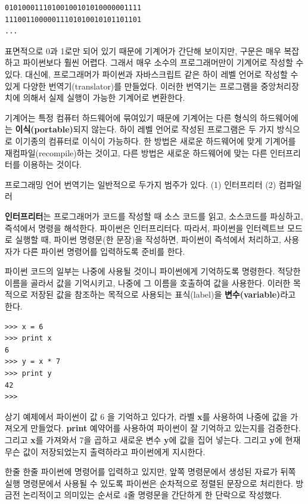 \beforeverb
\begin{verbatim}
01010001110100100101010000001111
11100110000011101010010101101101
...
\end{verbatim}
\afterverb
%
표면적으로 0과 1로만 되어 있기 때문에 기계어가 간단해 보이지만, 구문은 매우 복잡하고 파이썬보다 훨씬 어렵다. 
그래서 매우 소수의 프로그래머만이 기계어로 작성할 수 있다. 
대신에, 프로그래머가 파이썬과 자바스크립트 같은 하이 레벨 언어로 작성할 수 있게 다양한 번역기(translator)를 만들었다.  
이러한 번역기는 프로그램을 중앙처리장치에 의해서 실제 실행이 가능한 기계어로 변환한다.

기계어는 특정 컴퓨터 하드웨어에 묶여있기 때문에 기계어는 다른 형식의 하드웨어에는 {\bf 이식(portable)}되지 않는다. 
하이 레벨 언어로 작성된 프로그램은 두 가지 방식으로 이기종의 컴퓨터로 이식이 가능하다.
한 방법은 새로운 하드웨어에 맞게 기계어를 재컴파일(recompile)하는 것이고, 
다른 방법은 새로운 하드웨어에 맞는 다른 인터프리터를 이용하는 것이다.

프로그래밍 언어 번역기는 일반적으로 두가지 범주가 있다. 
(1) 인터프리터 (2) 컴파일러

{\bf 인터프리터}는 프로그래머가 코드를 작성할 때 소스 코드를 읽고, 소스코드를 파싱하고, 즉석에서 명령을 해석한다. 
파이썬은 인터프리터다. 
따라서, 파이썬을 인터렉트브 모드로 실행할 때, 파이썬 명령문(한 문장)을 작성하면, 파이썬이 즉석에서 처리하고, 
사용자가 다른 파이썬 명령어를 입력하도록 준비를 한다.

파이썬 코드의 일부는 나중에 사용될 것이니 파이썬에게 기억하도록 명령한다.
적당한 이름을 골라서 값을 기억시키고, 나중에 그 이름을 호출하여 값을 사용한다. 
이러한 목적으로 저장된 값을 참조하는 목적으로 사용되는 표식(label)을 {\bf 변수(variable)}라고 한다.

\beforeverb
\begin{verbatim}
>>> x = 6
>>> print x
6
>>> y = x * 7
>>> print y
42
>>> 
\end{verbatim}
\afterverb
%

상기 예제에서 파이썬이 값 6 을 기억하고 있다가, 라벨 {\bf x}를 사용하여 나중에 값을 가져오게 만들었다.
{\bf print} 예약어를 사용하여 파이썬이 잘 기억하고 있는지를 검증한다. 
그리고 {\bf x}를 가져와서 7을 곱하고 새로운 변수 {\bf y}에 값을 집어 넣는다. 
그리고 {\bf y}에 현재 무슨 값이 저장되었는지 출력하라고 파이썬에게 지시한다.

한줄 한줄 파이썬에 명령어를 입력하고 있지만, 
앞쪽 명령문에서 생성된 자료가 뒤쪽 실행 명령문에서 사용될 수 있도록 파이썬은 순차적으로 정렬된 문장으로 처리한다. 
방금전 논리적이고 의미있는 순서로 4줄 명령문을 간단하게 한 단락으로 작성했다.


